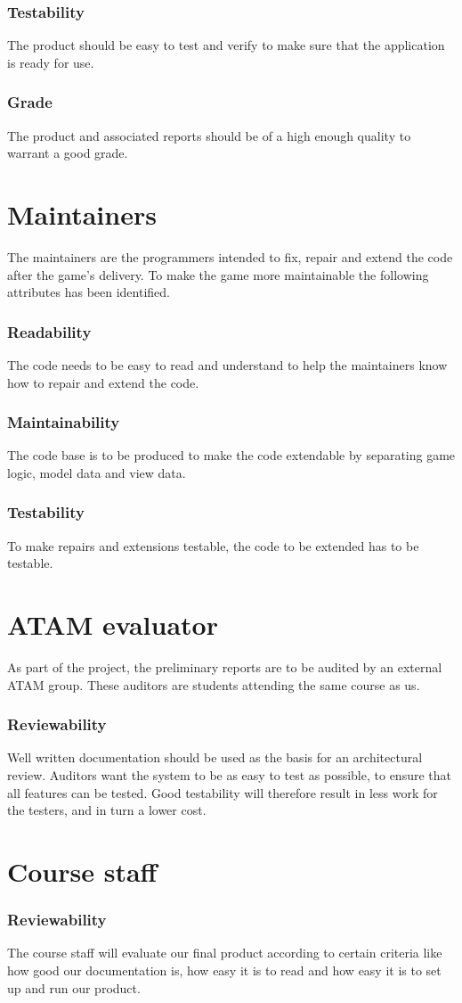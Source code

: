         \subsubsection*{Testability}
        The product should be easy to test and verify to make sure that the application is ready for use.

        \subsubsection*{Grade}
        The product and associated reports should be of a high enough quality to warrant a good grade.

    \section{Maintainers}
    The maintainers are the programmers intended to fix, repair and extend the code after the game's delivery. To make the game more maintainable the following attributes has been identified.

        \subsubsection*{Readability}
        The code needs to be easy to read and understand to help the maintainers know how to repair and extend the code.

        \subsubsection*{Maintainability}
        The code base is to be produced to make the code extendable by separating game logic, model data and view data.

        \subsubsection*{Testability}
        To make repairs and extensions testable, the code to be extended has to be testable.

    
    
    \section{ATAM evaluator}
    As part of the project, the preliminary reports are to be audited by an external ATAM group. These auditors are students attending the same course as us.

        \subsubsection*{Reviewability}
        Well written documentation should be used as the basis for an architectural review. Auditors want the system to be as easy to test as possible, to ensure that all features can be tested. Good testability will therefore result in less work for the testers, and in turn a lower cost.


    \section{Course staff}
        \subsubsection*{Reviewability}
        The course staff will evaluate our final product according to certain criteria like how good our documentation is, how easy it is to read and how easy it is to set up and run our product.